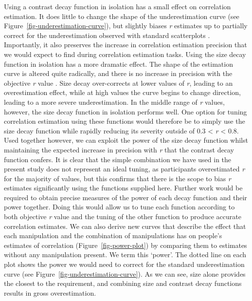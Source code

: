 \documentclass[manuscript, anonymous, screen]{acmart}
\begin{document}
Using a contrast decay function in isolation has a small effect on
correlation estimation. It does little to change the shape of the
underestimation curve (see Figure~\ref{fig-underestimation-curve}), but
slightly biases \emph{r} estimates up to partially correct for the
underestimation observed with standard scatterplots \citep{strain_2023}.
Importantly, it also preserves the increase in correlation estimation
precision that we would expect to find during correlation estimation
tasks. Using the size decay function in isolation has a more dramatic
effect. The shape of the estimation curve is altered quite radically,
and there is no increase in precision with the objective \emph{r} value
\citep{strain_2023b}. Size decay over-corrects at lower values of
\emph{r}, leading to an overestimation effect, while at high values the
curve begins to change direction, leading to a more severe
underestimation. In the middle range of \emph{r} values, however, the
size decay function in isolation performs well. One option for tuning
correlation estimation using these functions would therefore be to
simply use the size decay function while rapidly reducing its severity
outside of 0.3 \textless{} \emph{r} \textless{} 0.8. Used together
however, we can exploit the power of the size decay function whilst
maintaining the expected increase in precision with \emph{r} that the
contrast decay function confers. It is clear that the simple combination
we have used in the present study does not represent an ideal tuning, as
participants overestimated \emph{r} for the majority of values, but this
confirms that there is the scope to bias \emph{r} estimates
significantly using the functions supplied here. Further work would be
required to obtain precise measures of the power of each decay function
and their power together. Doing this would allow us to tune each
function according to both objective \emph{r} value and the tuning of
the other function to produce accurate correlation estimates. We can
also derive new curves that describe the effect that each manipulation
and the combination of manipulations has on people's estimates of
correlation (Figure~\ref{fig-power-plot}) by comparing them to estimates
without any manipulation present. We term this `power'. The dotted line
on each plot shows the power we would need to correct for the standard
underestimation curve (see Figure~\ref{fig-underestimation-curve}). As
we can see, size alone provides the closest to the requirement, and
combining size and contrast decay functions results in gross
overestimation.
\end{document}
